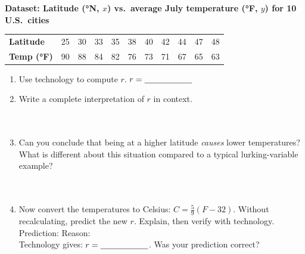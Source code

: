 \documentclass[10pt]{article}
\begin{document}
\begin{tcolorbox}[colback=white, colframe=black!40, boxrule=0.8pt, arc=2mm,
    left=4mm, right=4mm, top=3mm, bottom=3mm,
    title={\textbf{Tier E --- Extension}}, fonttitle=\bfseries, halign title=center]
\small

\textbf{Dataset: Latitude (°N, $x$) vs.\ average July temperature (°F, $y$) for 10 U.S.\ cities}

\vspace{6pt}
\renewcommand{\arraystretch}{1.4}
\begin{tabularx}{\linewidth}{@{} l *{10}{C{0.82cm}} @{}}
\textbf{Latitude}  & 25 & 30 & 33 & 35 & 38 & 40 & 42 & 44 & 47 & 48 \\
\textbf{Temp (°F)} & 90 & 88 & 84 & 82 & 76 & 73 & 71 & 67 & 65 & 63 \\
\end{tabularx}

\vspace{10pt}
\begin{enumerate}[leftmargin=1.6em, itemsep=0.16in]
  \item Use technology to compute $r$. \quad $r = \blank{2cm}$
  \item Write a complete interpretation of $r$ in context.\\[6pt]
        \writeline\\[2pt]\writeline\\[2pt]\writeline
  \item Can you conclude that being at a higher latitude \emph{causes} lower temperatures?
        What is different about this situation compared to a typical lurking-variable example?\\[6pt]
        \writeline\\[2pt]\writeline\\[2pt]\writeline
  \item Now convert the temperatures to Celsius: $C = \tfrac{5}{9}(F - 32)$.
        Without recalculating, predict the new $r$. Explain, then verify with technology.\\[6pt]
        Prediction: \blank{2cm} \quad Reason: \blank{8cm}\\[4pt]
        Technology gives: $r = \blank{2cm}$. Was your prediction correct?
\end{enumerate}
\end{tcolorbox}
\end{document}
